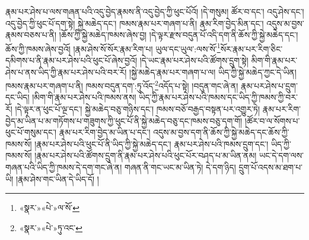 རྣམ་པར་ཤེས་པ་ལས་གཞན་པའི་འདུ་བྱེད་རྣམས་ནི་འདུ་བྱེད་ཀྱི་ཕུང་པོའོ། །དེ་གསུམ། ཚོར་བ་དང་། འདུ་ཤེས་དང་། འདུ་བྱེད་ཀྱི་ཕུང་པོ་དག་སྟེ། སྐྱེ་མཆེད་དང་། ཁམས་རྣམ་པར་གཞག་པ་ནི། རྣམ་རིག་བྱེད་མིན་དང་། འདུས་མ་བྱས་རྣམས་བཅས་པ་ནི། །ཆོས་ཀྱི་སྐྱེ་མཆེད་ཁམས་ཞེས་བྱ། །དེ་ལྟར་རྫས་བདུན་པོ་འདི་དག་ནི་ཆོས་ཀྱི་སྐྱེ་མཆེད་དང་། ཆོས་ཀྱི་ཁམས་ཞེས་བྱའོ། །རྣམ་ཤེས་སོ་སོར་རྣམ་རིག་པ། ཡུལ་དང་ཡུལ་:ལས་སོ་\footnote{«སྣར་»«པེ་»ལ་སོ་}སོར་རྣམ་པར་རིག་ཅིང་དམིགས་པ་ནི་རྣམ་པར་ཤེས་པའི་ཕུང་པོ་ཞེས་བྱའོ། །དེ་ཡང་རྣམ་པར་ཤེས་པའི་ཚོགས་དྲུག་སྟེ། མིག་གི་རྣམ་པར་ཤེས་པ་ནས་ཡིད་ཀྱི་རྣམ་པར་ཤེས་པའི་བར་རོ། །སྐྱེ་མཆེད་རྣམ་པར་གཞག་པ་ལ། ཡིད་ཀྱི་སྐྱེ་མཆེད་ཀྱང་དེ་ཡིན། ཁམས་རྣམ་པར་གཞག་པ་ནི། ཁམས་བདུན་དག་:ཏུ་འོད་\footnote{«སྣར་»«པེ་»ཏུ་འང་}འདོད་པ་སྟེ། །བདུན་གང་ཞེ་ན། རྣམ་པར་ཤེས་པ་དྲུག་དང་ཡིད། །མིག་གི་རྣམ་པར་ཤེས་པའི་ཁམས་ནས། ཡིད་ཀྱི་རྣམ་པར་ཤེས་པའི་ཁམས་དང་ཡིད་ཀྱི་ཁམས་ཀྱི་བར་རོ། །དེ་ལྟར་ན་ཕུང་པོ་ལྔ་དང་། སྐྱེ་མཆེད་བཅུ་གཉིས་དང་། ཁམས་བཅོ་བརྒྱད་བསྟན་པར་འགྱུར་ཏེ། རྣམ་པར་རིག་བྱེད་མ་ཡིན་པ་མ་གཏོགས་པ་གཟུགས་ཀྱི་ཕུང་པོ་ནི་སྐྱེ་མཆེད་བཅུ་དང་ཁམས་བཅུ་དག་གོ། །ཚོར་བ་ལ་སོགས་པ་ཕུང་པོ་གསུམ་དང་། རྣམ་པར་རིག་བྱེད་མ་ཡིན་པ་དང་། འདུས་མ་བྱས་དག་ནི་ཆོས་ཀྱི་སྐྱེ་མཆེད་དང་ཆོས་ཀྱི་ཁམས་སོ། །རྣམ་པར་ཤེས་པའི་ཕུང་པོ་ནི་ཡིད་ཀྱི་སྐྱེ་མཆེད་དང་། རྣམ་པར་ཤེས་པའི་ཁམས་དྲུག་དང་། ཡིད་ཀྱི་ཁམས་སོ། །རྣམ་པར་ཤེས་པའི་ཚོགས་དྲུག་ནི་རྣམ་པར་ཤེས་པའི་ཕུང་པོར་བཤད་པ་མ་ཡིན་ནམ། ཡང་དེ་དག་ལས་གཞན་པའི་ཡིད་ཀྱི་ཁམས་དེ་དག་གང་ཞེ་ན། གཞན་ནི་གང་ཡང་མ་ཡིན་ཏེ། དེ་དག་ཉིད། དྲུག་པོ་འདས་མ་ཐག་པ་ཡི། །རྣམ་ཤེས་གང་ཡིན་དེ་ཡིད་དོ། །
